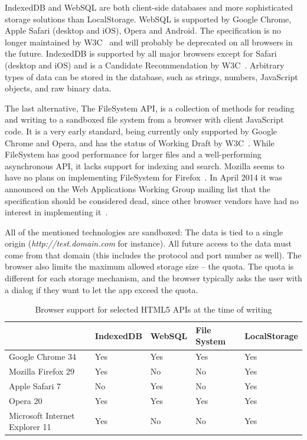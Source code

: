 IndexedDB and WebSQL are both client-side databases and more sophisticated storage solutions than LocalStorage. WebSQL is supported by Google Chrome, Apple Safari (desktop and iOS), Opera and Android. The specification is no longer maintained by W3C~\cite{WebSQL:Online} and will probably be deprecated on all browsers in the future. IndexedDB is supported by all major browsers except for Safari (desktop and iOS) and is a Candidate Recommendation by W3C~\cite{IndexedDB:Online}. Arbitrary types of data can be stored in the database, such as strings, numbers, JavaScript objects, and raw binary data.

The last alternative, The FileSystem API, is a collection of methods for reading and writing to a sandboxed file system from a browser with client JavaScript code. It is a very early standard, being currently only supported by Google Chrome and Opera, and has the status of Working Draft by W3C~\cite{FileSystem:Online}. While FileSystem has good performance for larger files and a well-performing asynchronous API, it lacks support for indexing and search. Mozilla seems to have no plans on implementing FileSystem for Firefox~\cite{MozillaFileSystem:Online}. In April 2014 it was announced on the Web Applications Working Group mailing list that the specification should be considered dead, since other browser vendors have had no interest in implementing it~\cite{FileSystemMailingList:Online}.

All of the mentioned technologies are sandboxed: The data is tied to a single origin (\emph{http://test.domain.com} for instance). All future access to the data must come from that domain (this includes the protocol and port number as well). The browser also limits the maximum allowed storage size – the quota. The quota is different for each storage mechanism, and the browser typically asks the user with a dialog if they want to let the app exceed the quota.

\begin{table}
    \begin{tabular}{|l|l|l|l|l|}
    \hline
                       & IndexedDB & WebSQL & File System & LocalStorage \\ \hline
    Google Chrome 34               & Yes       & Yes    & Yes  & Yes                      \\ \hline
    Mozilla Firefox 29             & Yes       & \cellcolor{red}No  & \cellcolor{red}No   & Yes                        \\ \hline
    Apple Safari 7                & \cellcolor{red}No        & Yes  & \cellcolor{red}No    & Yes                        \\ \hline
    Opera 20                       & Yes       & Yes    & Yes  & Yes                      \\ \hline
    Microsoft Internet Explorer 11 & Yes       & \cellcolor{red}No  & \cellcolor{red}No   & Yes                        \\ \hline
    \end{tabular}
    \caption {Browser support for selected HTML5 APIs at the time of writing}
\end{table}

